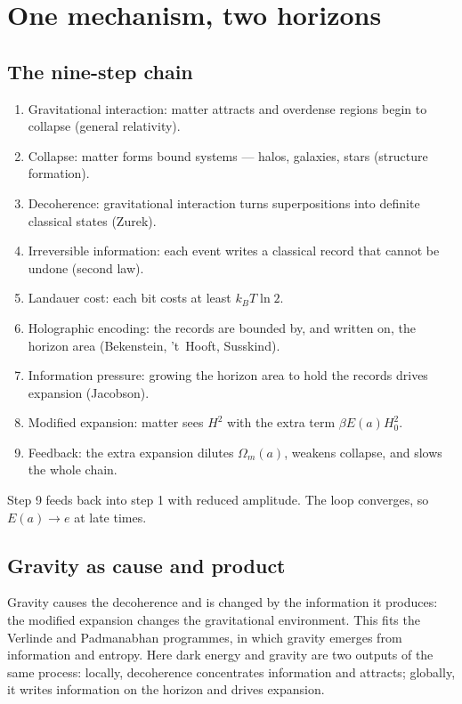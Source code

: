 \chapter{One mechanism, two horizons}\label{ch:theoryinterp}

\section{The nine-step chain}
\begin{enumerate}
\item Gravitational interaction: matter attracts and overdense regions begin to collapse (general relativity).
\item Collapse: matter forms bound systems --- halos, galaxies, stars (structure formation).
\item Decoherence: gravitational interaction turns superpositions into definite classical states (Zurek).
\item Irreversible information: each event writes a classical record that cannot be undone (second law).
\item Landauer cost: each bit costs at least $k_BT\ln2$.
\item Holographic encoding: the records are bounded by, and written on, the horizon area (Bekenstein, 't~Hooft, Susskind).
\item Information pressure: growing the horizon area to hold the records drives expansion (Jacobson).
\item Modified expansion: matter sees $H^2$ with the extra term $\beta E(a)H_0^2$.
\item Feedback: the extra expansion dilutes $\Omega_m(a)$, weakens collapse, and slows the whole chain.
\end{enumerate}
Step 9 feeds back into step 1 with reduced amplitude. The loop converges, so $E(a)\to e$ at late times.

\section{Gravity as cause and product}
Gravity causes the decoherence and is changed by the information it produces: the modified expansion changes the gravitational environment. This fits
the Verlinde and Padmanabhan programmes, in which gravity emerges from information and entropy. Here dark energy and gravity are two outputs of the
same process: locally, decoherence concentrates information and attracts; globally, it writes information on the horizon and drives expansion.

